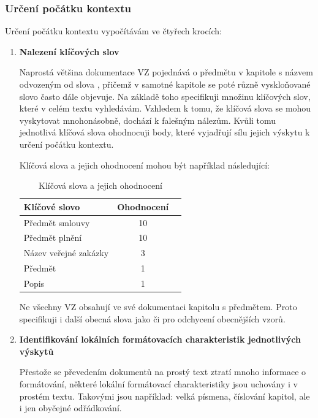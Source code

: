 \documentclass[thesis=M,czech]{FITthesis}[2019/12/23]
\begin{document}
\subsubsection{Určení počátku kontextu}
Určení počátku kontextu vypočítávám ve čtyřech krocích:
\begin{enumerate}
    \item \textbf{Nalezení klíčových slov}
    
    Naprostá většina dokumentace VZ pojednává o předmětu v kapitole s názvem odvozeným od slova , přičemž v samotné kapitole se poté různě vyskloňované slovo často dále objevuje. Na základě toho specifikuji množinu klíčových slov, které v celém textu vyhledávám. Vzhledem k tomu, že klíčová slova se mohou vyskytovat mnohonásobně, dochází k falešným nálezům. Kvůli tomu jednotlivá klíčová slova ohodnocuji body, které vyjadřují sílu jejich výskytu k určení počátku kontextu.
    

    Klíčová slova a jejich ohodnocení mohou být například následující:
    \begin{table}[h!]
    \centering
    \begin{tabular}{ |l|c|c| }
     \hline
      Klíčové slovo & Ohodnocení \\\hline
      \hline
    Předmět smlouvy & 10\\
    Předmět plnění & 10\\
    Název veřejné zakázky & 3\\
    Předmět  & 1\\
    Popis & 1\\\hline
    \end{tabular}
    \caption[Klíčová slova a jejich ohodnocení]{Klíčová slova a jejich ohodnocení
    }
    \label{table:example_subj_keywords}
    \end{table}

    Ne všechny VZ obsahují ve své dokumentaci kapitolu s předmětem. Proto specifikuji i další obecná slova jako  či  pro odchycení obecnějších vzorů.
    
    \item \textbf{Identifikování lokálních formátovacích charakteristik jednotlivých výskytů}
    
    Přestože se převedením dokumentů na prostý text ztratí mnoho informace o formátování, některé lokální formátovací charakteristiky jsou uchovány i v prostém textu. Takovými jsou například: velká písmena, číslování kapitol, ale i jen obyčejné odřádkování.
    

\end{enumerate}
\end{document}
